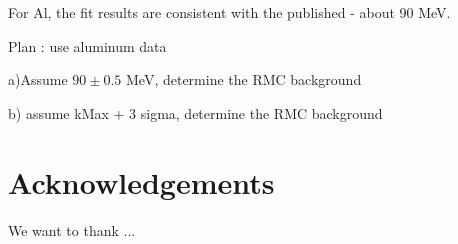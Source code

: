 \documentclass[12pt]{article}
\begin{document}
For Al, the fit results are consistent with the published - about 90 MeV.


Plan : use aluminum data

a)Assume $90 \pm 0.5$ MeV, determine the RMC background

b) assume kMax + 3 sigma, determine the RMC background

\section{ Acknowledgements }

We want to thank ...




\end{document}

